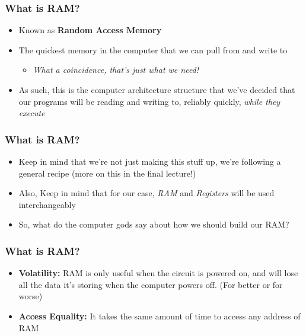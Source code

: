 \documentclass{beamer}
\begin{document}
             \begin{frame}
             	\frametitle{What is RAM?}
             	\begin{itemize}
             		\item Known as \textbf{Random Access Memory}
             		\item The quickest memory in the computer that we can pull from and write to
             		\begin{itemize}
             			\item \textit{What a coincidence, that's just what we need!}
             		\end{itemize}
             		\item As such, this is the computer architecture structure that we've decided that our programs will be reading and writing to, reliably quickly, \textit{while they execute}
             		
             	\end{itemize}
             \end{frame}
             
             \begin{frame}
             	\frametitle{What is RAM?}
             	\begin{itemize}
             		\item Keep in mind that we're not just making this stuff up, we're following a general recipe (more on this in the final lecture!)
             		
             		\item Also, Keep in mind that for our case, \textit{RAM} and \textit{Registers} will be used interchangeably
             		\item So, what do the computer gods say about how we should build our RAM? 
             	\end{itemize}
             \end{frame}
             
             \begin{frame}
             	\frametitle{What is RAM?}
             	\begin{itemize}
             		\item \textbf{Volatility:} RAM is only useful when the circuit is powered on, and will lose all the data it's storing when the computer powers off. (For better or for worse)
             		\item \textbf{Access Equality:} It takes the same amount of time to access any address of RAM
             	\end{itemize}
             \end{frame}
             
\end{document}
